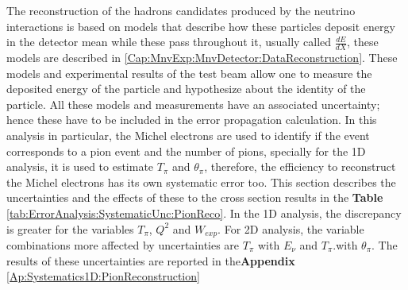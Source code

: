 The reconstruction of the hadrons candidates produced by the neutrino interactions is based on models that describe how these particles deposit energy in the detector mean while these pass throughout it, usually called $\frac{dE}{dX}$, these models are described in \ref{Cap:MnvExp:MnvDetector:DataReconstruction}. These models and experimental results of the test beam allow one to measure the deposited energy of the particle and hypothesize about the identity of the particle. All these models and measurements have an associated uncertainty; hence these have to be included in the error propagation calculation. In this analysis in particular, the Michel electrons are used to identify if the event corresponds to a pion event and the number of pions, specially for the 1D analysis, it is used to estimate $T_\pi$ and $\theta_\pi$, therefore, the efficiency to reconstruct the Michel electrons has its own systematic error too. This section describes the uncertainties and the effects of these to the cross section results in the \textbf{Table} \ref{tab:ErrorAnalysis:SystematicUnc:PionReco}. In the 1D analysis, the discrepancy is greater for the variables $T_\pi$, $Q^2$ and $W_{exp}$. For 2D analysis, the variable combinations more affected by uncertainties are $T_\pi$ with $E_\nu$ and $T_\pi$.with $\theta_\pi$. The results of these uncertainties are reported in the\textbf{Appendix} \ref{Ap:Systematics1D:PionReconstruction}

